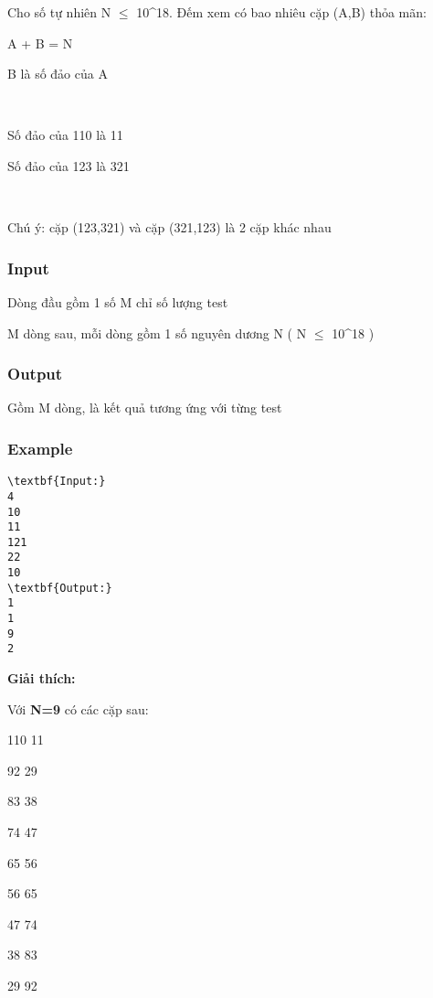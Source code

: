 

Cho số tự nhiên N  $\le$  10^18. Đếm xem có bao nhiêu cặp (A,B) thỏa mãn:

A + B = N

B là số đảo của A

 

Số đảo của 110 là 11

Số đảo của 123 là 321

 

Chú ý: cặp (123,321) và cặp (321,123) là 2 cặp khác nhau

\subsubsection{Input}

Dòng đầu gồm 1 số M chỉ số lượng test

M dòng sau, mỗi dòng gồm 1 số nguyên dương N ( N  $\le$  10^18 )

\subsubsection{Output}

Gồm M dòng, là kết quả tương ứng với từng test

\subsubsection{Example}
\begin{verbatim}
\textbf{Input:}
4
10
11
121
22
10
\textbf{Output:}
1
1
9
2\end{verbatim}

\textbf{Giải thích:}


Với\textbf{ N=9} có các cặp sau:


110 11


92 29


83 38


74 47


65 56


56 65


47 74


38 83


29 92

 
